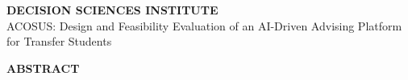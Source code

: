 \documentclass[letterpaper,11pt]{article}
\begin{document}
\begin{center}
\textbf{DECISION SCIENCES INSTITUTE}\\[6pt]
ACOSUS: Design and Feasibility Evaluation of an AI-Driven Advising Platform for Transfer Students
\end{center}

\bigskip

%
%
%
%
%
\begin{center}
\textbf{ABSTRACT}
\end{center}
\end{document}
